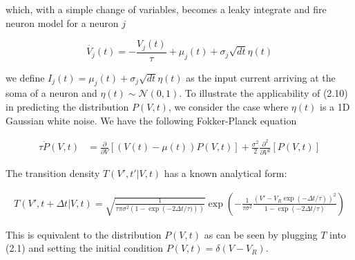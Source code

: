 \documentclass{ucetd}
\begin{document}
which, with a simple change of variables, becomes a leaky integrate and fire neuron model for a neuron $j$

\begin{equation*}
\dot{V_{j}}(t) = -\frac{V_{j}(t)}{\tau} + \mu_{j}(t) + \sigma_{j}\sqrt{dt}\eta(t)
\end{equation*}

we define $I_{j}(t) = \mu_{j}(t) + \sigma_{j}\sqrt{dt}\eta(t)$ as the input current arriving at the soma of a neuron and $\eta(t) \sim \mathcal{N}(0,1)$. To illustrate the applicability of (2.10) in predicting the distribution $P(V,t)$, we consider the case where $\eta(t)$ is a 1D Gaussian white noise. We have the following Fokker-Planck equation

\begin{align}
\tau\dot{P}(V,t) &= \frac{\partial}{\partial V}[\left(V(t)-\mu(t)\right) P(V,t)] + \frac{\sigma^{2}}{2}\frac{\partial^{2}}{\partial V^{2}}[P(V,t)]
\end{align}

The transition density $T(V',t'|V,t)$ has a known analytical form:

\begin{align*}
T(V',t+\Delta t|V,t) = \sqrt{\frac{1}{\tau\pi\sigma^{2}(1-\exp\left(-2\Delta t/\tau)\right))}}\exp\left(-\frac{1}{\tau\sigma^{2}}\frac{(V'-V_{R}\exp(-\Delta t/\tau))^{2}}{1-\exp\left(-2\Delta t/\tau\right)}\right)
\end{align*} 

This is equivalent to the distribution $P(V,t)$ as can be seen by plugging $T$ into (2.1) and setting the initial condition $P(V,t) = \delta(V-V_{R})$.
\end{document}
